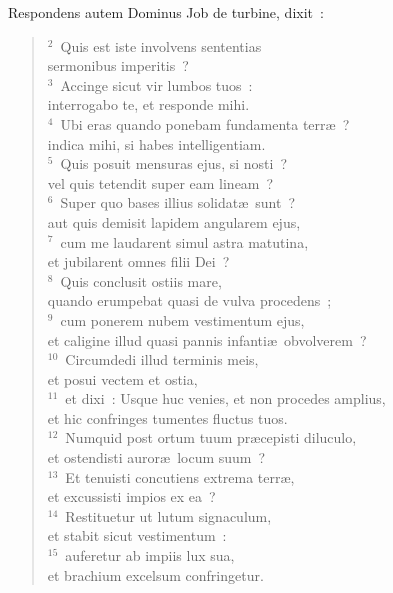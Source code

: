\lettrine[lines=3,image=true,loversize=0.05,lraise=-0.03]{R}{}espondens autem Dominus Job de turbine, dixit~:
\begin{flushleft}\begin{verse}\vspace{6pt}${}^{2}$~Quis est iste involvens sententias\\ sermonibus imperitis~?\\
${}^{3}$~Accinge sicut vir lumbos tuos~:\\ interrogabo te, et responde mihi.\\
${}^{4}$~Ubi eras quando ponebam fundamenta terr\ae~?\\ indica mihi, si habes intelligentiam.\\
${}^{5}$~Quis posuit mensuras ejus, si nosti~?\\ vel quis tetendit super eam lineam~?\\
${}^{6}$~Super quo bases illius solidat\ae\ sunt~?\\ aut quis demisit lapidem angularem ejus,\\
${}^{7}$~cum me laudarent simul astra matutina,\\ et jubilarent omnes filii Dei~?\\
${}^{8}$~Quis conclusit ostiis mare,\\ quando erumpebat quasi de vulva procedens~;\\
${}^{9}$~cum ponerem nubem vestimentum ejus,\\ et caligine illud quasi pannis infanti\ae\ obvolverem~?\\
${}^{10}$~Circumdedi illud terminis meis,\\ et posui vectem et ostia,\\
${}^{11}$~et dixi~: Usque huc venies, et non procedes amplius,\\ et hic confringes tumentes fluctus tuos.\\
${}^{12}$~Numquid post ortum tuum pr\ae cepisti diluculo,\\ et ostendisti auror\ae\ locum suum~?\\
${}^{13}$~Et tenuisti concutiens extrema terr\ae ,\\ et excussisti impios ex ea~?\\
${}^{14}$~Restituetur ut lutum signaculum,\\ et stabit sicut vestimentum~:\\
${}^{15}$~auferetur ab impiis lux sua,\\ et brachium excelsum confringetur.\\

\end{verse}
\end{flushleft}
